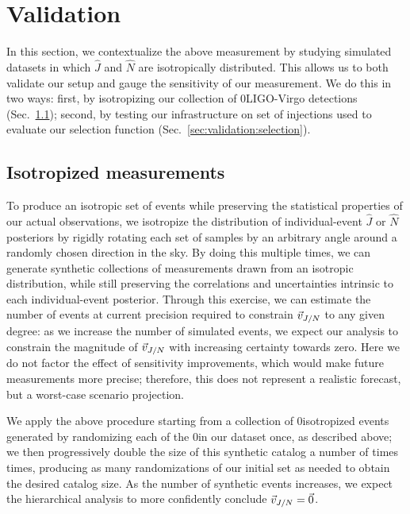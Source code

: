 \documentclass[aps,prd,twocolumn,superscriptaddress,preprintnumbers,floatfix,nofootinbib]{revtex4-2}
\newcommand{\Nevents}{0}
\begin{document}
\section{Validation}
\label{sec:validation}

In this section, we contextualize the above measurement by studying simulated datasets in which $\hat{J}$ and $\hat{N}$ are isotropically distributed.
This allows us to both validate our setup and gauge the sensitivity of our measurement.
We do this in two ways: first, by isotropizing our collection of \Nevents LIGO-Virgo detections (Sec.~\ref{sec:validation:isotropized}); second, by testing our infrastructure on set of injections used to evaluate our selection function (Sec.~\ref{sec:validation:selection}).

\subsection{Isotropized measurements}
\label{sec:validation:isotropized}

To produce an isotropic set of events while preserving the statistical properties of our actual observations, we isotropize the distribution of individual-event $\hat{J}$ or $\hat{N}$ posteriors by rigidly rotating each set of samples by an arbitrary angle around a randomly chosen direction in the sky.
By doing this multiple times, we can generate synthetic collections of measurements drawn from an isotropic distribution, while still preserving the correlations and uncertainties intrinsic to each individual-event posterior.
Through this exercise, we can estimate the number of events at current precision required to constrain $\vec{v}_{J/N}$ to any given degree: as we increase the number of simulated events, we expect our analysis to constrain the magnitude of $\vec{v}_{J/N}$ with increasing certainty towards zero.
Here we do not factor the effect of sensitivity improvements, which would make future measurements more precise; therefore, this does not represent a realistic forecast, but a worst-case scenario projection.

We apply the above procedure starting from a collection of \Nevents isotropized events generated by randomizing each of the \Nevents in our dataset once, as described above; we then progressively double the size of this synthetic catalog a number of times times, producing as many randomizations of our initial set as needed to obtain the desired catalog size.
As the number of synthetic events increases, we expect the hierarchical analysis to more confidently conclude $\vec{v}_{J/N} = \vec{0}$.
\end{document}
